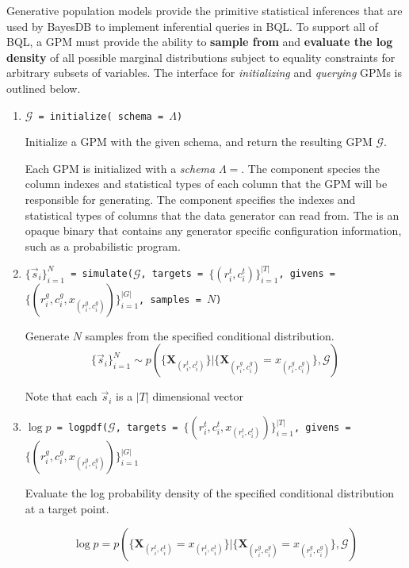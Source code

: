 \documentclass[10pt,letterpaper]{article}
\newcommand{\set}[1]{\{#1\}}
\begin{document}
Generative population models provide the primitive statistical inferences that
are used by BayesDB to implement inferential queries in BQL. To support all of
BQL, a GPM must provide the ability to \textbf{sample from} and \textbf{evaluate
the log density} of all possible marginal distributions subject to equality
constraints for arbitrary subsets of variables. The interface for
\textit{initializing} and \textit{querying} GPMs is outlined below.

\begin{enumerate}

\item \texttt{$\mathcal{G}$ = initialize( schema = $\Lambda$)}

    Initialize a GPM with the given schema, and return the resulting GPM
    $\mathcal{G}$.

    Each GPM is initialized with a \textit{schema} $\Lambda=$. The  component species
    the column indexes and statistical types of each column that the GPM will be
    responsible for generating. The  component specifies the
    indexes and statistical types of columns that the data generator can read
    from. The  is an opaque binary that contains any generator
    specific configuration information, such as a probabilistic program.

\item \texttt{$\set{\vec{s}_i}_{i=1}^N$ = 
    simulate($\mathcal{G}$, targets = $\set{(r_i^t,c_i^t)}_{i=1}^{|T|}$, givens
    = $\set{(r_i^g, c_i^g, x_{(r_i^g, c_i^g)})}_{i=1}^{|G|}$, samples = $N$)}

    Generate $N$ samples from the specified conditional distribution.
    $$
    \set{\vec{s}_i}_{i=1}^N \sim p( \set{ \mathbf{X}_{(r_i^t,c_i^t)} } |
    \set{ \mathbf{X}_{(r_i^g,c_i^g)} = x_{(r_i^g,c_i^g)} }, \mathcal{G})
    $$

    Note that each $\vec{s}_i$ is a $|T|$ dimensional vector

\item \texttt{$\log p$ =
    logpdf($\mathcal{G}$, targets = $\set{(r_i^t, c_i^t, x_{(r_i^t,
    c_i^t)})}_{i=1}^{|T|}$, givens = $\set{(r_i^g, c_i^g, x_{(r_i^g,
    c_i^g)})}_{i=1}^{|G|}$}

    Evaluate the log probability density of the specified conditional
    distribution at a target point.

    $$
    \log p = p( \set{ \mathbf{X}_{(r_i^t,c_i^t)} = x_{(r_i^t,c_i^t)} } |
    \set{ \mathbf{X}_{(r_i^g,c_i^g)} = x_{(r_i^g,c_i^g)} }, \mathcal{G})
    $$

\end{enumerate}
\end{document}
